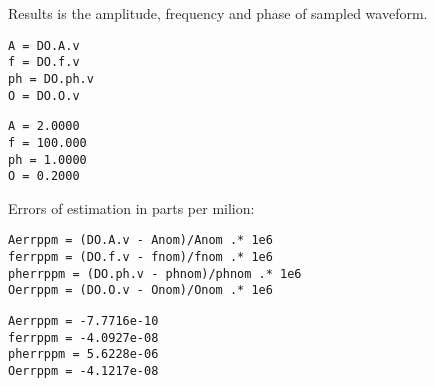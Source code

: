 Results is the amplitude, frequency and phase of sampled waveform.

\begin{lstlisting}
A = DO.A.v
f = DO.f.v
ph = DO.ph.v
O = DO.O.v
\end{lstlisting}
\begin{lstlisting}[language={},xleftmargin=5pt,frame=none]
A = 2.0000
f = 100.000
ph = 1.0000
O = 0.2000

\end{lstlisting}


Errors of estimation in parts per milion:

\begin{lstlisting}
Aerrppm = (DO.A.v - Anom)/Anom .* 1e6
ferrppm = (DO.f.v - fnom)/fnom .* 1e6
pherrppm = (DO.ph.v - phnom)/phnom .* 1e6
Oerrppm = (DO.O.v - Onom)/Onom .* 1e6
\end{lstlisting}
\begin{lstlisting}[language={},xleftmargin=5pt,frame=none]
Aerrppm = -7.7716e-10
ferrppm = -4.0927e-08
pherrppm = 5.6228e-06
Oerrppm = -4.1217e-08

\end{lstlisting}


\stopcontents[localtoc]
